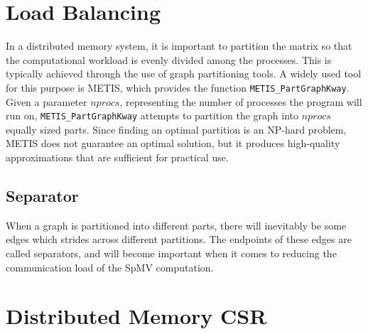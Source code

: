 \section{Load Balancing}
In a distributed memory system, it is important to partition the matrix so that the computational workload is evenly divided among the processes. This is typically achieved through the use of graph partitioning tools. A widely used tool for this purpose is METIS, which provides the function \texttt{METIS\_PartGraphKway}. Given a parameter \(nprocs\), representing the number of processes the program will run on, \texttt{METIS\_PartGraphKway} attempts to partition the graph into \(nprocs\) equally sized parts. Since finding an optimal partition is an NP-hard problem, METIS does not guarantee an optimal solution, but it produces high-quality approximations that are sufficient for practical use.

\subsection{Separator}
When a graph is partitioned into different parts, there will inevitably be some edges which strides across different partitions. The endpoints of these edges are called separators, and will become important when it comes to reducing the communication load of the SpMV computation.



\section{Distributed Memory CSR}










